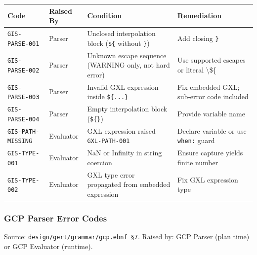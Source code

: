 \begin{center}\small
\begin{tabular}{p{3.5cm}p{1.8cm}p{5.5cm}p{3.5cm}}
\hline
\textbf{Code} & \textbf{Raised By} & \textbf{Condition} & \textbf{Remediation} \\
\hline
\texttt{GIS-PARSE-001}    & Parser & Unclosed interpolation block (\texttt{\$\{} without \texttt{\}}) & Add closing \texttt{\}} \\
\texttt{GIS-PARSE-002}    & Parser & Unknown escape sequence (WARNING only, not hard error) & Use supported escapes or literal \textbackslash\$\{ \\
\texttt{GIS-PARSE-003}    & Parser & Invalid GXL expression inside \texttt{\$\{...\}} & Fix embedded GXL; sub-error code included \\
\texttt{GIS-PARSE-004}    & Parser & Empty interpolation block (\texttt{\$\{\}}) & Provide variable name \\
\texttt{GIS-PATH-MISSING} & Evaluator & GXL expression raised \texttt{GXL-PATH-001} & Declare variable or use \texttt{when:} guard \\
\texttt{GIS-TYPE-001}     & Evaluator & NaN or Infinity in string coercion & Ensure capture yields finite number \\
\texttt{GIS-TYPE-002}     & Evaluator & GXL type error propagated from embedded expression & Fix GXL expression type \\
\hline
\end{tabular}
\end{center}

\subsubsection{GCP Parser Error Codes}
\label{sec:parse-gate:error-codes:gcp}

Source: \texttt{design/gert/grammar/gcp.ebnf~\S7}.
Raised by: GCP Parser (plan time) or GCP Evaluator (runtime).

